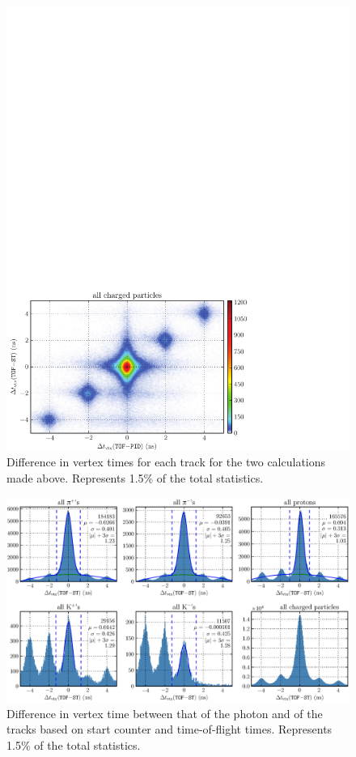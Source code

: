 \begin{figure}[htbp]\begin{center}
\includegraphics[width=0.5\columnwidth]{figures/calib/st/dvertex_time_pid_st.pdf}
\caption[vertex timing,  vs.\ ]{\label{fig:dvertex_time_pid_st}Difference in vertex times for each track for the two calculations made above. Represents 1.5\% of the total statistics.}
\end{center}\end{figure}

\begin{figure}[htbp]\begin{center}
\includegraphics[width=0.9\columnwidth]{figures/calib/st/dvertex_time_st.eps}
\caption[vertex timing, ]{\label{fig:dvertex_time_st}Difference in vertex time between that of the photon and of the tracks based on start counter and time-of-flight times. Represents 1.5\% of the total statistics.}
\end{center}\end{figure}


